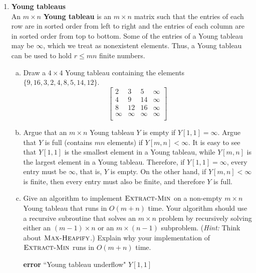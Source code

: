 \documentclass[12pt,reqno]{amsart}
\newif\ifanswer
\begin{document}
\begin{enumerate}[1.]
\item \textbf{Young tableaus}\\ An $m\times n$ \textbf{Young tableau} is an $m\times n$ matrix such that the entries of each row are in sorted order from left to right and the entries of each column are in sorted order from top to bottom. Some of the entries of a Young tableau may be $\infty$, which we treat as nonexistent elements. Thus, a Young tableau can be used to hold $r \leq mn$ finite numbers.
\begin{enumerate}[a.]
    \item Draw a $4\times 4$ Young tableau containing the elements $\{9, 16, 3, 2, 4, 8, 5, 14, 12\}$.
    \ifanswer
    \noindent {\bf \\Solution}
    $$
    \begin{bmatrix}
        2      & 3      & 5      & \infty\\
        4      & 9      & 14     & \infty\\
        8      & 12     & 16     & \infty\\
        \infty & \infty & \infty & \infty\\
    \end{bmatrix}
    $$
    \vspace{1cm}
    \item Argue that an $m\times n$ Young tableau $Y$ is empty if $Y[1, 1] = \infty$. Argue that $Y$ is full (contains $mn$ elements) if $Y[m, n] < \infty$.
    \ifanswer
    \noindent {\bf \\Solution}
    It is easy to see that $Y[1, 1]$ is the smallest element in a Young tableau, while $Y[m, n]$ is the largest element in a Young tableau. Therefore, if $Y[1, 1] = \infty$, every entry must be $\infty$, that is, $Y$ is empty. On the other hand, if $Y[m, n] < \infty$ is finite, then every entry must also be finite, and therefore $Y$ is full.
    \vspace{1cm}
    \item Give an algorithm to implement $\textsc{Extract-Min}$ on a non-empty $m\times n$ Young tableau that runs in $O(m + n)$ time. Your algorithm should use a recursive subroutine that solves an $m\times n$ problem by recursively solving either an $(m - 1)\times n$ or an $m\times (n - 1)$ subproblem. (\textit{Hint:} Think about $\textsc{Max-Heapify}$.) Explain why your implementation of $\textsc{Extract-Min}$ runs in $O(m + n)$ time.
    \ifanswer
    \noindent {\bf \\Solution}
    \begin{algorithm}
        \caption{$\textsc{Minimum}(Y)$}
        \begin{algorithmic}[1]
                \STATE \textbf{error} ``Young tableau underflow"
            \ENDIF
            \RETURN $Y[1, 1]$
        \end{algorithmic}
    \end{algorithm}
    \newpage


\end{enumerate}
\end{enumerate}
\end{document}
